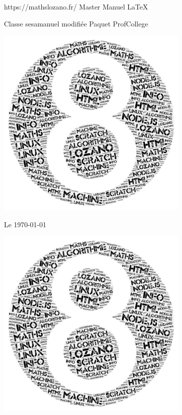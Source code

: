 \pagestyle{backCover}
\parindent=0pt
https://mathslozano.fr/  Master Manuel \LaTeX 

Classe sesamanuel modifiée Paquet ProfCollege
\begin{center}
    \includegraphics[scale=0.5]{images/8.png}%
\end{center}
\hrulefill
\def\currentpath{./resume}          %

\hrulefill
\vspace*{1cm}
\begin{center}\bfseries\Large
    \myAuthorName
\end{center}
    
\begin{flushright}
       Le \today 
\end{flushright}   
\begin{center}
    \includegraphics[scale=0.5]{images/8.png}%
\end{center}
